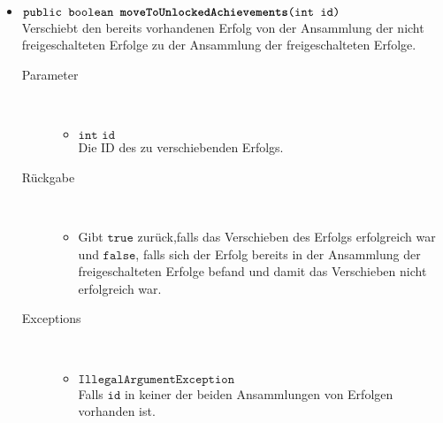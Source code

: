 \begin{description}
\begin{itemize}
	\item $\texttt{public boolean \textbf{moveToUnlockedAchievements}(int id)}$ \\ Verschiebt den bereits vorhandenen Erfolg von der Ansammlung der nicht freigeschalteten Erfolge zu der Ansammlung der freigeschalteten Erfolge.
		\begin{description}
			\item[Parameter] \hfill \\
			\vspace{-.8cm}
			\begin{itemize}
				\item $\texttt{int id}$ \\ Die ID des zu verschiebenden Erfolgs.
			\end{itemize}
			\item[Rückgabe] \hfill \\
			\vspace{-.8cm}
			\begin{itemize}
				\item Gibt $\texttt{true}$ zurück,falls das Verschieben des Erfolgs erfolgreich war und $\texttt{false}$, falls sich der Erfolg bereits in der Ansammlung der freigeschalteten Erfolge befand und damit das Verschieben nicht erfolgreich war.
			\end{itemize}
			\item[Exceptions] \hfill \\
			\vspace{-.8cm}
			\begin{itemize}
				\item $\texttt{IllegalArgumentException}$ \\ Falls $\texttt{id}$ in keiner der beiden Ansammlungen von Erfolgen vorhanden ist.
			\end{itemize}
		\end{description}	


\end{itemize}
\end{description}
